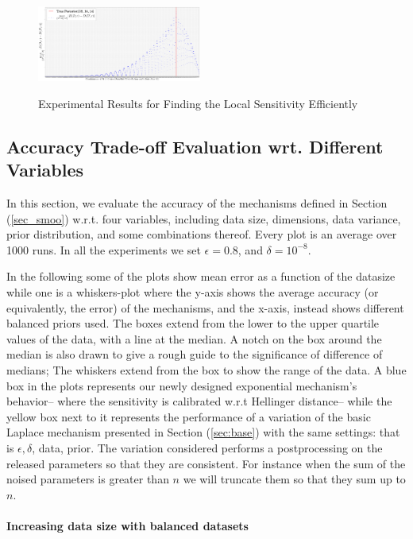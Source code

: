 \documentclass[sigconf]{acmart}
\begin{document}
\begin{figure}[ht]
\centering
\includegraphics[width=0.48\textwidth]{efficiency}
\label{fig_efficiency}
\caption{Experimental Results for Finding the Local Sensitivity Efficiently}
\end{figure}

\subsection{Accuracy Trade-off Evaluation wrt. Different Variables}
\label{subsec_vs_variables}
In this section, we evaluate the accuracy of the mechanisms defined in
Section (\ref{sec_smoo}) w.r.t. four variables, including data size, dimensions,
data variance, prior distribution, and some combinations thereof.
Every plot is an average over 1000 runs. In all the experiments we set
$\epsilon = 0.8$, and $\delta = 10^{-8}$.

\noindent In the following some of the plots show
mean error as a function of the datasize while one
is a whiskers-plot where the y-axis shows the average
accuracy (or equivalently, the error) of the mechanisms, and the x-axis, instead shows
different balanced priors used. The boxes extend from the lower to the upper quartile values
of the data, with a line at the median. A notch on the box around the
median is also drawn to give a rough guide to the significance of
difference of medians; The whiskers extend from the box to show the
range of the data. A blue box in the plots represents our newly
designed exponential mechanism's behavior-- where the sensitivity is calibrated
w.r.t Hellinger distance-- while the yellow box next to
it represents the performance of a variation of the basic Laplace
mechanism presented in Section (\ref{sec:base}) with the same
settings: that is $\epsilon, \delta$, data, prior. The variation
considered performs a postprocessing on the released parameters so
that they are consistent. For instance when the sum of the noised
parameters is greater than $n$ we will truncate them so that they sum
up to $n$.

\paragraph{Increasing data size with balanced datasets}
\label{subsubsec_vs_datasize}
\end{document}
